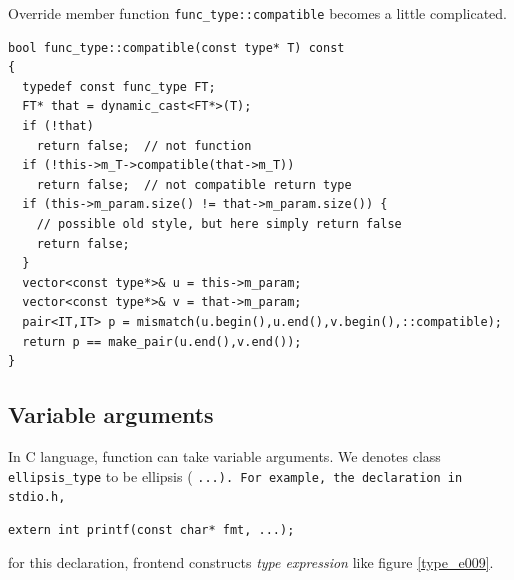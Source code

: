 Override member function {\tt{func\_type::compatible}}
becomes a little complicated.

\begin{verbatim}
bool func_type::compatible(const type* T) const
{
  typedef const func_type FT;
  FT* that = dynamic_cast<FT*>(T);
  if (!that)
    return false;  // not function
  if (!this->m_T->compatible(that->m_T))
    return false;  // not compatible return type
  if (this->m_param.size() != that->m_param.size()) {
    // possible old style, but here simply return false
    return false;
  }
  vector<const type*>& u = this->m_param;
  vector<const type*>& v = that->m_param;
  pair<IT,IT> p = mismatch(u.begin(),u.end(),v.begin(),::compatible);
  return p == make_pair(u.end(),v.end());
}
\end{verbatim}

\subsection{Variable arguments}
\label{type_e004}
In C language, function can take variable arguments.
We denotes class {\tt{ellipsis\_type}} to be ellipsis ( \tt{...}).
For example, the declaration in {\tt{stdio.h}},
\begin{verbatim}
extern int printf(const char* fmt, ...);
\end{verbatim}
for this declaration, frontend constructs {\em type expression}
like figure \ref{type_e009}.
